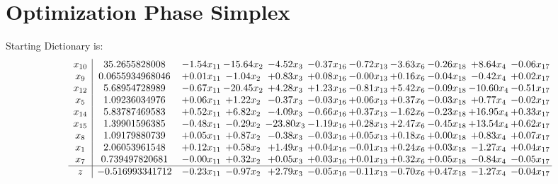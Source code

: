 \documentclass[9pt]{article}
\begin{document}
\section{Optimization Phase Simplex}
Starting Dictionary is:
\[\begin{array}{c| c c@{\hskip 2pt} c@{\hskip 2pt} c@{\hskip 2pt} c@{\hskip 2pt} c@{\hskip 2pt} c@{\hskip 2pt} c@{\hskip 2pt} c@{\hskip 2pt} c@{\hskip 2pt} }
 x_{10}   &  35.2655828008 & -1.54 x_{11} & -15.64 x_{2} & -4.52 x_{3} & -0.37 x_{16} & -0.72 x_{13} & -3.63 x_{6} & -0.26 x_{18} & +  8.64 x_{4} & -0.06 x_{17}\\
 x_{9}   &  0.0655934968046 & +  0.01 x_{11} & -1.04 x_{2} & +  0.83 x_{3} & +  0.08 x_{16} & -0.00 x_{13} & +  0.16 x_{6} & -0.04 x_{18} & -0.42 x_{4} & +  0.02 x_{17}\\
 x_{12}   &  5.68954728989 & -0.67 x_{11} & -20.45 x_{2} & +  4.28 x_{3} & +  1.23 x_{16} & -0.81 x_{13} & +  5.42 x_{6} & -0.09 x_{18} & -10.60 x_{4} & -0.51 x_{17}\\
 x_{5}   &  1.09236034976 & +  0.06 x_{11} & +  1.22 x_{2} & -0.37 x_{3} & -0.03 x_{16} & +  0.06 x_{13} & +  0.37 x_{6} & -0.03 x_{18} & +  0.77 x_{4} & -0.02 x_{17}\\
 x_{14}   &  5.83787469583 & +  0.52 x_{11} & +  6.82 x_{2} & -4.09 x_{3} & -0.66 x_{16} & +  0.37 x_{13} & -1.62 x_{6} & -0.23 x_{18} & + 16.95 x_{4} & +  0.33 x_{17}\\
 x_{15}   &  1.39901596385 & -0.48 x_{11} & -0.29 x_{2} & -23.80 x_{3} & -1.19 x_{16} & +  0.28 x_{13} & +  2.47 x_{6} & -0.45 x_{18} & + 13.54 x_{4} & +  0.62 x_{17}\\
 x_{8}   &  1.09179880739 & +  0.05 x_{11} & +  0.87 x_{2} & -0.38 x_{3} & -0.03 x_{16} & +  0.05 x_{13} & +  0.18 x_{6} & +  0.00 x_{18} & +  0.83 x_{4} & +  0.07 x_{17}\\
 x_{1}   &  2.06053961548 & +  0.12 x_{11} & +  0.58 x_{2} & +  1.49 x_{3} & +  0.04 x_{16} & -0.01 x_{13} & +  0.24 x_{6} & +  0.03 x_{18} & -1.27 x_{4} & +  0.04 x_{17}\\
 x_{7}   &  0.739497820681 & -0.00 x_{11} & +  0.32 x_{2} & +  0.05 x_{3} & +  0.03 x_{16} & +  0.01 x_{13} & +  0.32 x_{6} & +  0.05 x_{18} & -0.84 x_{4} & -0.05 x_{17}\\
\hline
z    &  -0.516993341712 & -0.23 x_{11} & -0.97 x_{2} & +  2.79 x_{3} & -0.05 x_{16} & -0.11 x_{13} & -0.70 x_{6} & +  0.47 x_{18} & -1.27 x_{4} & -0.04 x_{17}\\
\end{array}\]
\end{document}
